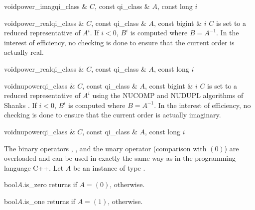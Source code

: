 \begin{fcode}{void}{power_imag}{qi_class & $C$, const qi_class & $A$, const long $i$}
\end{fcode}

\begin{fcode}{void}{power_real}{qi_class & $C$, const qi_class & $A$, const bigint & $i$}
  $C$ is set to a reduced representative of $A^i$.  If $i < 0$, $B^i$ is computed where $B =
  A^{-1}$.  In the interest of efficiency, no checking is done to ensure that the current order
  is actually real.
\end{fcode}

\begin{fcode}{void}{power_real}{qi_class & $C$, const qi_class & $A$, const long $i$}
\end{fcode}

\begin{fcode}{void}{nupower}{qi_class & $C$, const qi_class & $A$, const bigint & $i$}
  $C$ is set to a reduced representative of $A^i$ using the NUCOMP and NUDUPL algorithms of
  Shanks \cite{Cohen:1995}.  If $i < 0$, $B^i$ is computed where $B = A^{-1}$.  In the interest
  of efficiency, no checking is done to ensure that the current order is actually imaginary.
\end{fcode}

\begin{fcode}{void}{nupower}{qi_class & $C$, const qi_class & $A$, const long $i$}
\end{fcode}



\COMP

The binary operators \code{==}, \code{!=}, and the unary operator \code{!} (comparison with
$(0)$) are overloaded and can be used in exactly the same way as in the programming language C++.
Let $A$ be an instance of type .

\begin{cfcode}{bool}{$A$.is_zero}{}
  returns \TRUE if $A = (0)$, \FALSE otherwise.
\end{cfcode}

\begin{cfcode}{bool}{$A$.is_one}{}
  returns \TRUE if $A = (1)$, \FALSE otherwise.
\end{cfcode}

